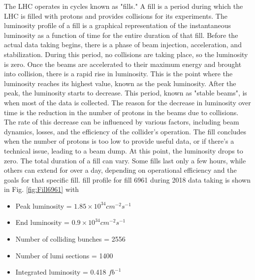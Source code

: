 The LHC operates in cycles known as "fills." A fill is a period during which the LHC is filled with protons and provides collisions for its experiments. The luminosity profile of a fill is a graphical representation of the instantaneous luminosity as a function of time for the entire duration of that fill. Before the actual data taking begins, there is a phase of beam injection, acceleration, and stabilization. During this period, no collisions are taking place, so the luminosity is zero. Once the beams are accelerated to their maximum energy and brought into collision, there is a rapid rise in luminosity. This is the point where the luminosity reaches its highest value, known as the peak luminosity. After the peak, the luminosity starts to decrease. This period, known as "stable beams", is when most of the data is collected. The reason for the decrease in luminosity over time is the reduction in the number of protons in the beams due to collisions.
The rate of this decrease can be influenced by various factors, including beam dynamics, losses, and the efficiency of the collider's operation. The fill concludes when the number of protons is too low to provide useful data, or if there's a technical issue, leading to a beam dump. At this point, the luminosity drops to zero. The total duration of a fill can vary. Some fills last only a few hours, while others can extend for over a day, depending on operational efficiency and the goals for that specific fill. fill profile for fill 6961 during 2018 data taking is shown in Fig. \ref{fig:Fill6961} with

\begin{itemize}
  
\item Peak luminosity = $1.85 \times 10^{34} cm^{-2} s^{-1}$
\item End luminosity = $0.9 \times 10^{34} cm^{-2} s^{-1}$ 
\item Number of colliding bunches = 2556
\item Number of lumi sections = 1400
\item Integrated luminosity = 0.418 $fb^{-1}$

\end{itemize}
    
